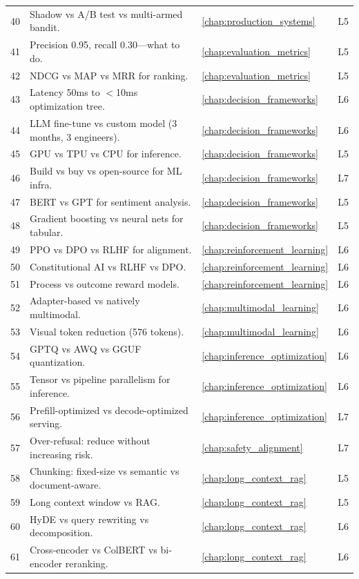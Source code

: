 \begin{longtable}{rp{8.5cm}ll}
40 & Shadow vs A/B test vs multi-armed bandit. & \ref{chap:production_systems} & L5 \\
41 & Precision 0.95, recall 0.30---what to do. & \ref{chap:evaluation_metrics} & L5 \\
42 & NDCG vs MAP vs MRR for ranking. & \ref{chap:evaluation_metrics} & L5 \\
43 & Latency 50ms to $<$10ms optimization tree. & \ref{chap:decision_frameworks} & L6 \\
44 & LLM fine-tune vs custom model (3 months, 3 engineers). & \ref{chap:decision_frameworks} & L6 \\
45 & GPU vs TPU vs CPU for inference. & \ref{chap:decision_frameworks} & L5 \\
46 & Build vs buy vs open-source for ML infra. & \ref{chap:decision_frameworks} & L7 \\
47 & BERT vs GPT for sentiment analysis. & \ref{chap:decision_frameworks} & L5 \\
48 & Gradient boosting vs neural nets for tabular. & \ref{chap:decision_frameworks} & L5 \\
49 & PPO vs DPO vs RLHF for alignment. & \ref{chap:reinforcement_learning} & L6 \\
50 & Constitutional AI vs RLHF vs DPO. & \ref{chap:reinforcement_learning} & L6 \\
51 & Process vs outcome reward models. & \ref{chap:reinforcement_learning} & L6 \\
52 & Adapter-based vs natively multimodal. & \ref{chap:multimodal_learning} & L6 \\
53 & Visual token reduction (576 tokens). & \ref{chap:multimodal_learning} & L6 \\
54 & GPTQ vs AWQ vs GGUF quantization. & \ref{chap:inference_optimization} & L6 \\
55 & Tensor vs pipeline parallelism for inference. & \ref{chap:inference_optimization} & L6 \\
56 & Prefill-optimized vs decode-optimized serving. & \ref{chap:inference_optimization} & L7 \\
57 & Over-refusal: reduce without increasing risk. & \ref{chap:safety_alignment} & L7 \\
58 & Chunking: fixed-size vs semantic vs document-aware. & \ref{chap:long_context_rag} & L5 \\
59 & Long context window vs RAG. & \ref{chap:long_context_rag} & L5 \\
60 & HyDE vs query rewriting vs decomposition. & \ref{chap:long_context_rag} & L6 \\
61 & Cross-encoder vs ColBERT vs bi-encoder reranking. & \ref{chap:long_context_rag} & L6 \\
\end{longtable}

